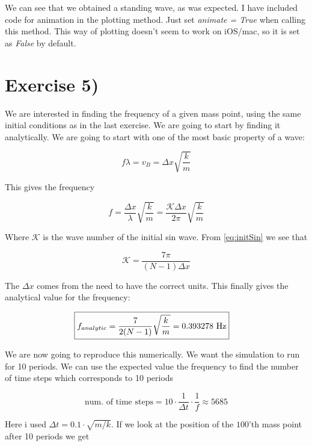 \documentclass[a4paper,norsk, 10pt]{article}
\begin{document}
We can see that we obtained a standing wave, as was expected. I have included code for animation in the plotting method. Just set \textit{animate = True} when calling this method. This way of plotting doesn't seem to work on iOS/mac, so it is set as \textit{False} by default.

\section{Exercise 5)}

We are interested in finding the frequency of a given mass point, using the same initial conditions as in the last exercise. We are going to start by finding it analytically. We are going to start with one of the most basic property of a wave:

\begin{equation}
f\lambda = v_B = \Delta x\sqrt{\frac{k}{m}}
\end{equation}

This gives the frequency

\begin{equation}
f = \frac{\Delta x}{\lambda}\sqrt{\frac{k}{m}} = \frac{\mathcal{K}\Delta x}{2\pi}\sqrt{\frac{k}{m}}
\end{equation}

Where $\mathcal{K}$ is the wave number of the initial sin wave. From \eqref{eq:initSin} we see that

\begin{equation}
\mathcal{K} = \frac{7\pi}{(N-1)\Delta x}
\end{equation}

The $\Delta x$ comes from the need to have the correct units. This finally gives the analytical value for the frequency:

\begin{align}
\Aboxed{
f_{analytic} = \frac{7}{2(N-1)}\sqrt{\frac{k}{m}} = 0.393278\text{ Hz}
}
\end{align}

We are now going to reproduce this numerically. We want the simulation to run for 10 periods. We can use the expected value the frequency to find the number of time steps which corresponds to 10 periods

\begin{equation}
\text{num. of time steps} = 10\cdot \frac{1}{\Delta t}\cdot \frac{1}{f} \approx 5685
\end{equation}

Here i used $\Delta t = 0.1\cdot\sqrt{m/k}$. If we look at the position of the $100$'th mass point after 10 periods we get
\end{document}

